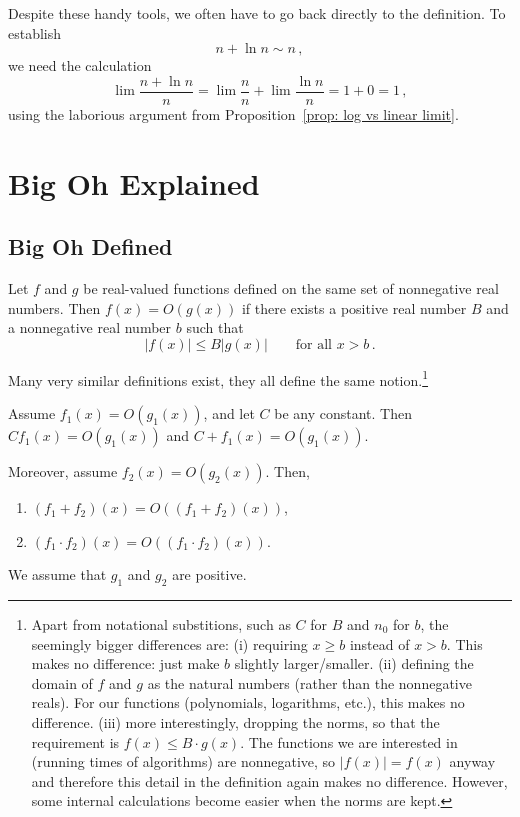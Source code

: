 \documentclass{tstextbook}
\begin{document}
Despite these handy tools, we often have to go back directly to the definition.
To establish 
\[n + \ln n \sim n\,,\]
we need the calculation
\[ \lim \frac{n+ \ln n}{n} = \lim\frac{n}{n} + \lim\frac{\ln n}{n} = 1 + 0= 1\,,\]
using the laborious argument from Proposition~\ref{prop: log vs linear limit}.

\chapter{Big Oh Explained}

\section{Big Oh Defined}
\begin{definition}
Let $f$ and $g$ be real-valued functions defined on the same set of nonnegative real numbers.
Then $f(x)= O(g(x))$ if there exists a positive real number $B$ and a nonnegative real number $b$ such
that
\[ |f(x)| \leq B |g(x)| \qquad\text{for all $x > b$}\,.\]
\end{definition}


Many very similar definitions exist, they all define the same notion.\footnote{
  Apart from notational substitions, such as $C$ for $B$ and $n_0$ for $b$, the seemingly bigger differences are:
  (i) requiring $x\geq b$ instead of $x> b$.
  This makes no difference: just make $b$ slightly larger/smaller.
  (ii) defining the domain of $f$ and $g$ as the natural numbers (rather than the nonnegative reals).
  For our functions (polynomials, logarithms, etc.), this makes no difference.
  (iii) more interestingly, dropping the norms, so that the requirement is $f(x)\leq B\cdot g(x)$.
  The functions we are interested in (running times of algorithms) are nonnegative, so $|f(x)|= f(x)$ anyway and therefore this detail in the definition again makes no difference.
  However, some internal calculations become easier when the norms are kept.
}


\begin{theorem}
  Assume $f_1(x) = O(g_1(x))$, and let $C$ be any constant.
  Then $Cf_1(x) = O(g_1(x))$ and $C+f_1(x) = O(g_1(x))$.

  Moreover, 
  assume $f_2(x) = O(g_2(x))$.
  Then, 
  \begin{enumerate}
    \item $(f_1 + f_2)(x)  = O((f_1+f_2)(x))$,
    \item $(f_1 \cdot f_2)(x)  = O((f_1\cdot f_2)(x))$.
    \end{enumerate}
  We assume that $g_1$ and $g_2$ are positive.
\end{theorem}
\end{document}
